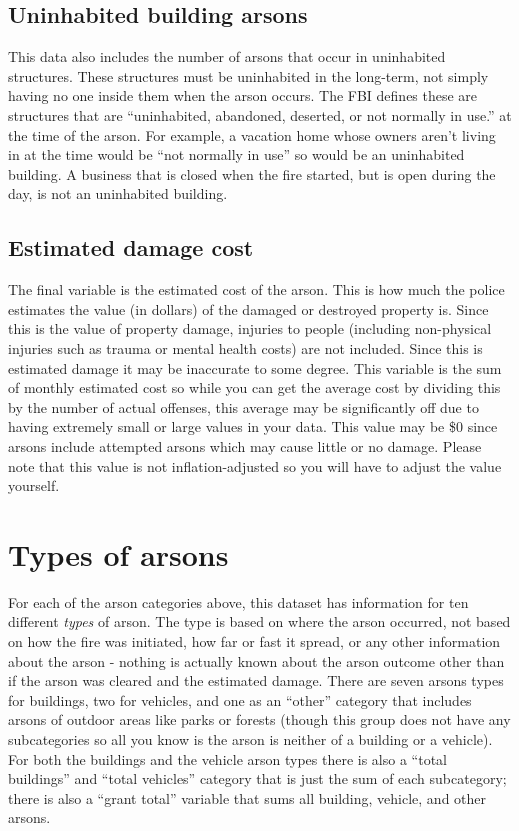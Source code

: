 \documentclass[
  12pt,
  openany]{book}
\begin{document}
\hypertarget{uninhabited-building-arsons}{%
\subsection{Uninhabited building arsons}\label{uninhabited-building-arsons}}

This data also includes the number of arsons that occur in uninhabited structures. These structures must be uninhabited in the long-term, not simply having no one inside them when the arson occurs. The FBI defines these are structures that are ``uninhabited, abandoned, deserted, or not normally in use.'' at the time of the arson. For example, a vacation home whose owners aren't living in at the time would be ``not normally in use'' so would be an uninhabited building. A business that is closed when the fire started, but is open during the day, is not an uninhabited building.

\hypertarget{estimated-damage-cost}{%
\subsection{Estimated damage cost}\label{estimated-damage-cost}}

The final variable is the estimated cost of the arson. This is how much the police estimates the value (in dollars) of the damaged or destroyed property is. Since this is the value of property damage, injuries to people (including non-physical injuries such as trauma or mental health costs) are not included. Since this is estimated damage it may be inaccurate to some degree. This variable is the sum of monthly estimated cost so while you can get the average cost by dividing this by the number of actual offenses, this average may be significantly off due to having extremely small or large values in your data. This value may be \$0 since arsons include attempted arsons which may cause little or no damage. Please note that this value is not inflation-adjusted so you will have to adjust the value yourself.

\hypertarget{arsonType}{%
\section{Types of arsons}\label{arsonType}}

For each of the arson categories above, this dataset has information for ten different \emph{types} of arson. The type is based on where the arson occurred, not based on how the fire was initiated, how far or fast it spread, or any other information about the arson - nothing is actually known about the arson outcome other than if the arson was cleared and the estimated damage. There are seven arsons types for buildings, two for vehicles, and one as an ``other'' category that includes arsons of outdoor areas like parks or forests (though this group does not have any subcategories so all you know is the arson is neither of a building or a vehicle). For both the buildings and the vehicle arson types there is also a ``total buildings'' and ``total vehicles'' category that is just the sum of each subcategory; there is also a ``grant total'' variable that sums all building, vehicle, and other arsons.
\end{document}
